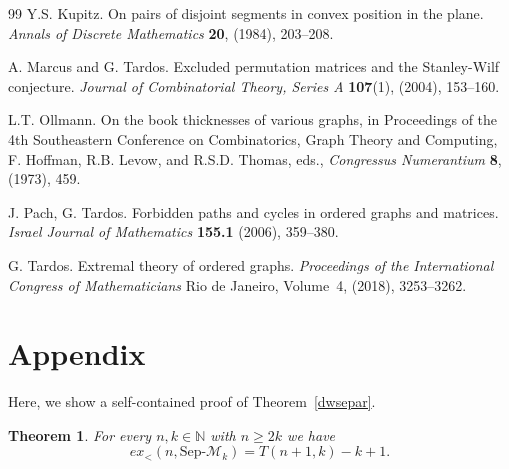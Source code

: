 \documentclass[11pt]{article}
\newtheorem{theorem}{Theorem}[section]
\theoremstyle{definition}
\begin{document}
\begin{thebibliography}{99}
 Y.S. Kupitz. 
On pairs of disjoint segments in convex position in the plane. {\it Annals of Discrete Mathematics} {\bf 20}, (1984), 203--208.

 A. Marcus and G. Tardos. 
Excluded permutation matrices and the Stanley-Wilf conjecture. {\it Journal of Combinatorial Theory, Series A} {\bf 107}(1), (2004), 153--160.

L.T. Ollmann. 
On the book thicknesses of various graphs, in Proceedings of the 4th Southeastern Conference on Combinatorics, Graph Theory and Computing, F. Hoffman, R.B. Levow, and R.S.D. Thomas, eds., {\it Congressus Numerantium} {\bf 8}, (1973), 459.

 J. Pach, G. Tardos. 
Forbidden paths and cycles in ordered graphs and matrices. {\it Israel Journal of Mathematics} {\bf 155.1} (2006), 359--380.


 G. Tardos.
Extremal theory of ordered graphs.
{\it Proceedings of the International Congress of Mathematicians} Rio de Janeiro, Volume~4, (2018), 3253--3262.
\end{thebibliography}

\appendix

\section{Appendix}

Here, we show a self-contained proof of Theorem~\ref{dwsepar}.

\begin{theorem} \label{thm:sep}
For every $n,k\in\mathbb N$ with $n\ge 2k$ we have
$$ex_<(n,\text{Sep-}\mathcal M_k)
= T(n+1,k)-k+1.$$      
\end{theorem}
\end{document}
